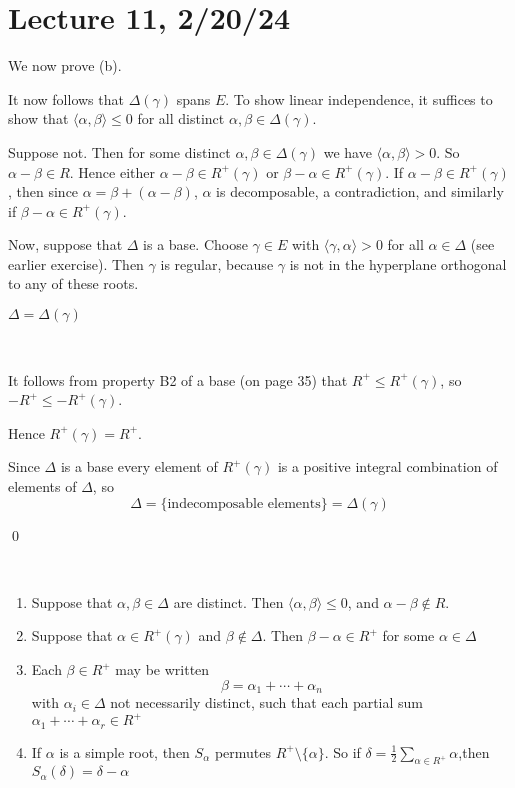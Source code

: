 \documentclass[x11names,reqno,14pt]{extarticle}
\begin{document}
\section*{Lecture 11, 2/20/24}

We now prove (b). 

It now follows that $\Delta(\gamma)$ spans $E$. To show linear independence, it suffices to show that $\langle\alpha,\beta\rangle\leq0$ for all distinct $\alpha,\beta\in\Delta(\gamma)$. 

Suppose not. Then for some distinct $\alpha,\beta\in\Delta(\gamma)$ we have $\langle\alpha,\beta\rangle>0$. So $\alpha-\beta\in R$. Hence either $\alpha-\beta\in R^+(\gamma)$ or $\beta-\alpha\in R^+(\gamma)$. If $\alpha-\beta\in R^+(\gamma)$, then since $\alpha = \beta + (\alpha-\beta)$, $\alpha$ is decomposable, a contradiction, and similarly if $\beta-\alpha\in R^+(\gamma)$. 

Now, suppose that $\Delta$ is a base. Choose $\gamma\in E$ with $\langle\gamma,\alpha\rangle>0$ for all $\alpha\in\Delta$ (see earlier exercise). Then $\gamma$ is regular, because $\gamma$ is not in the hyperplane orthogonal to any of these roots. 

\claim

$\Delta=\Delta(\gamma)$

\proof
\,

It follows from property B2 of a base (on page 35) that $R^+\leq R^+(\gamma)$, so $-R^+\leq-R^+(\gamma)$. 

Hence $R^+(\gamma) = R^+$. 

Since $\Delta$ is a base every element of $R^+(\gamma)$ is a positive integral combination of elements of $\Delta$, so 
\[
\Delta = \{\text{indecomposable elements}\} = \Delta(\gamma)
\]

\qed

\prop 
\,
\begin{enumerate}

\item Suppose that $\alpha,\beta\in\Delta$ are distinct. Then $\langle\alpha,\beta\rangle\leq0$, and $\alpha-\beta\not\in R$. 

\item Suppose that $\alpha\in R^+(\gamma)$ and $\beta\not\in\Delta$. Then $\beta-\alpha\in R^+$ for some $\alpha\in\Delta$

\item Each $\beta\in R^+$ may be written 
\[
\beta = \alpha_1 + \cdots + \alpha_n
\]
with $\alpha_i\in\Delta$ not necessarily distinct, such that each partial sum $\alpha_1 + \cdots + \alpha_r \in R^+$

\item If $\alpha$ is a simple root, then $S_\alpha$ permutes $R^+\setminus\{\alpha\}$. So if $\delta = \frac12\sum_{\alpha\in R^+}\alpha$,then $S_\alpha(\delta) = \delta-\alpha$

\end{enumerate}
\end{document}
